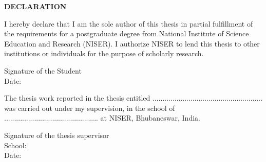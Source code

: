 \begin{center}
{\bf DECLARATION}
\end{center}

I hereby declare that I am the sole author of this thesis in partial fulfillment of the requirements for a postgraduate degree from National Institute of Science Education and Research (NISER). I authorize NISER to lend this thesis to other institutions or individuals for the purpose of scholarly research.

\vskip1.0in

\hspace*{3.5in} {Signature of the Student} \\
\hspace*{3.5in} {Date:}

\vskip1.0in
\vskip1.0in

The thesis work reported in the thesis entitled .......................................................  was carried out under my supervision, in the school of ............................................... at NISER, Bhubaneswar, India.

\vskip1.0in

\hspace*{3in} {Signature of the thesis supervisor} \\
\hspace*{3in} {School:}\\
\hspace*{3in} {Date:}